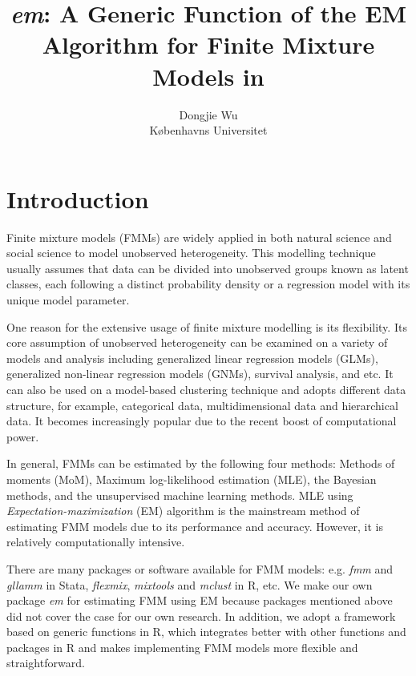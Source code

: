 \documentclass[nojss]{jss}
\title{\emph{em}: A Generic Function of the EM Algorithm for Finite Mixture Models in \proglang{R}}
\author{Dongjie Wu\\Københavns Universitet}
\begin{document}
   \section{Introduction}
Finite mixture models (FMMs) are widely applied in both natural science and social science to model unobserved heterogeneity. This modelling technique usually assumes that data can be divided into unobserved groups known as latent classes, each following a distinct probability density or a regression model with its unique model parameter. 

One reason for the extensive usage of finite mixture modelling is its flexibility. Its core assumption of unobserved heterogeneity can be examined on a variety of models and analysis including generalized linear regression models (GLMs), generalized non-linear regression models (GNMs), survival analysis, and etc. It can also be used on a model-based clustering technique and adopts different data structure, for example, categorical data, multidimensional data and hierarchical data.
It becomes increasingly popular due to the recent boost of computational power.

In general, FMMs can be estimated by the following four methods: Methods of moments (MoM), Maximum log-likelihood estimation (MLE), the Bayesian methods, and the unsupervised machine learning methods. MLE using \emph{Expectation-maximization} (EM) algorithm is the mainstream method of estimating FMM models due to its performance and accuracy. However, it is relatively computationally intensive. 

There are many packages or software available for FMM models: e.g.  \emph{fmm}\citep{deb2007} and \emph{gllamm}\citep{rabe2004gllamm} in Stata, \emph{flexmix}\citep{leisch2004flexmix}, \emph{mixtools}\citep{benaglia2010mixtools} and \emph{mclust} in R, etc.
We make our own package \emph{em} for estimating FMM using EM because packages mentioned above did not cover the case for our own research.
In addition, we adopt a framework based on generic functions in R, which integrates better with other functions and packages in R and makes implementing FMM models more flexible and straightforward.
\end{document}
